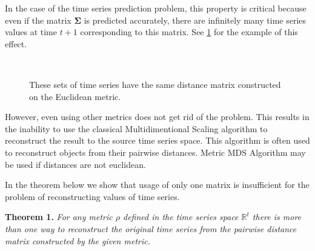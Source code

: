 \documentclass[12pt]{article}
\begin{document}
In the case of the time series prediction problem, this property is critical because even if the matrix $\mathbf{\Sigma}$ is predicted accurately, there are infinitely many time series values at time $t+1$ corresponding to this matrix. See \ref{fig:fig1} for the example of this effect.
\begin{figure}[!htbp]
	\centering
	\\
	\caption{These sets of time series have the same distance matrix constructed on the Euclidean metric.}
	\label{fig:fig1}
\end{figure}

However, even using other metrics does not get rid of the problem. This results in the inability to use the classical Multidimentional Scaling \cite{MDS} algorithm to reconstruct the result to the source time series space. This algorithm is often used to reconstruct objects from their pairwise distances. Metric MDS Algorithm  \cite{inbook} may be used if distances are not euclidean.

In the theorem below we show that usage of only one matrix is insufficient for the problem of reconstructing values of time series.

\textbf{Theorem 1.} \emph{For any metric $\rho$ defined in the time series space $\mathbb{R}^t$ there is more than one way to reconstruct the original time series from the pairwise distance matrix constructed by the given metric.}	
\end{document}
